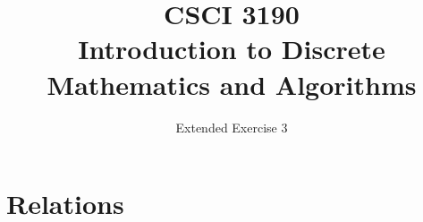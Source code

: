 \documentclass{sig-alternate-05-2015}
\begin{document}






%

\title{CSCI 3190 \\ Introduction to Discrete Mathematics and Algorithms}
\subtitle{Extended Exercise 3}

\maketitle
\begin{abstract}

\end{abstract}

\keywords{}

\section{Relations}
\end{document}
